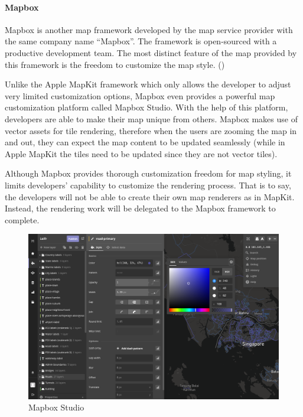 \documentclass[12pt,a4paper]{article}
\begin{document}
                \paragraph{Mapbox}
                Mapbox is another map framework developed by the map service provider with the same company name ``Mapbox''. The framework is open-sourced with a productive development team. The most distinct feature of the map provided by this framework is the freedom to customize the map style. (\citet{MapboxDocumentation})
                
                Unlike the Apple MapKit framework which only allows the developer to adjust very limited customization options, Mapbox even provides a powerful map customization platform called Mapbox Studio. With the help of this platform, developers are able to make their map unique from others. Mapbox makes use of vector assets for tile rendering, therefore when the users are zooming the map in and out, they can expect the map content to be updated seamlessly (while in Apple MapKit the tiles need to be updated since they are not vector tiles).
                
                Although Mapbox provides thorough customization freedom for map styling, it limits developers' capability to customize the rendering process. That is to say, the developers will not be able to create their own map renderers as in MapKit. Instead, the rendering work will be delegated to the Mapbox framework to complete.
                
                \begin{figure}
                    \includegraphics[width=.8\textwidth]{4-1-2-2-c}
                    \centering
                    \caption{Mapbox Studio}
                    \label{fig:mapbox-studio}
                \end{figure}
                
\end{document}
